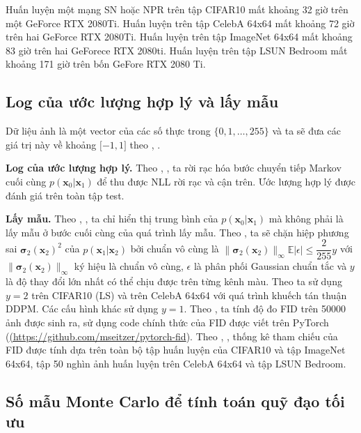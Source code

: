 \documentclass[14pt, a4paper]{article}
\numberwithin{equation}{section}
\numberwithin{figure}{section}
\numberwithin{dl}{section}
\numberwithin{md}{section}
\numberwithin{bd}{section}
\numberwithin{dn}{section}
\numberwithin{hq}{section}
\begin{document}
    Huấn luyện một mạng SN hoặc NPR trên tập CIFAR10 mất khoảng 32 giờ trên một GeForce RTX 2080Ti.
    Huấn luyện trên tập CelebA 64x64 mất khoảng 72 giờ trên hai GeForce RTX 2080Ti.
    Huấn luyện trên tập ImageNet 64x64 mất khoảng 83 giờ trên hai GeForece RTX 2080ti. 
    Huấn luyện trên tập LSUN Bedroom mất khoảng 171 giờ trên bốn GeFore RTX 2080 Ti.

    \subsection{Log của ước lượng hợp lý và lấy mẫu}

    Dữ liệu ảnh là một vector của các số thực trong $\lbrace 0, 1, \dots, 255 \rbrace$ và ta sẽ đưa các giá trị này về khoảng $\lbrack -1, 1 \rbrack$ theo \cite{ho2020denoising}, \cite{bao2021analytic}.

    \textbf{Log của ước lượng hợp lý.} Theo \cite{ho2020denoising}, \cite{bao2021analytic}, ta rời rạc hóa bước chuyển tiếp Markov cuối cùng $p(\boldsymbol{x}_0 \vert \boldsymbol{x}_1)$ để thu được NLL rời rạc và cận trên.
    Ước lượng hợp lý được đánh giá trên toàn tập test.

    \textbf{Lấy mẫu.} Theo \cite{ho2020denoising}, \cite{bao2021analytic}, ta chỉ hiển thị trung bình của $p(\boldsymbol{x}_0 \vert \boldsymbol{x}_1)$ mà không phải là lấy mẫu ở bước cuối cùng của quá trình lấy mẫu.
    Theo \cite{bao2021analytic}, ta sẽ chặn hiệp phương sai $\boldsymbol{\sigma}_2 (\boldsymbol{x}_2)^2$ của $p(\boldsymbol{x}_1 \vert \boldsymbol{x}_2)$ bởi chuẩn vô cùng là $\lVert \boldsymbol{\sigma}_2 (\boldsymbol{x}_2) \rVert_{\infty} \mathbb{E} \lvert \epsilon \rvert \leq \dfrac{2}{255}y$ với $\lVert \boldsymbol{\sigma}_2 (\boldsymbol{x}_2) \rVert_{\infty}$ ký hiệu là chuẩn vô cùng,
    $\epsilon$ là phân phối Gaussian chuẩn tắc và $y$ là độ thay đổi lớn nhất có thể chịu được trên từng kênh màu.
    Theo \cite{bao2021analytic} ta sử dụng $y = 2$ trên CIFAR10 (LS) và trên CelebA 64x64 với quá trình khuếch tán thuận DDPM.
    Các cấu hình khác sử dụng $y=1$.
    Theo \cite{bao2021analytic}, ta tính độ đo FID trên 50000 ảnh được sinh ra, sử dụng code chính thức của FID được viết trên PyTorch (\url{(https://github.com/mseitzer/pytorch-fid}).
    Theo \cite{nichol2021improved}, \cite{bao2021analytic}, thống kê tham chiếu của FID được tính dựa trên toàn bộ tập huấn luyện của CIFAR10 và tập ImageNet 64x64, tập 50 nghìn ảnh huấn luyện trên CelebA 64x64 và tập LSUN Bedroom.

    \subsection{Số mẫu Monte Carlo để tính toán quỹ đạo tối ưu}
\end{document}
